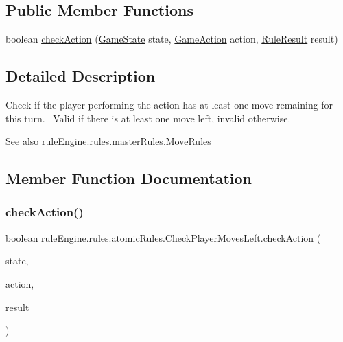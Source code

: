 \subsection*{Public Member Functions}
\begin{DoxyCompactItemize}
\item 
boolean \mbox{\hyperlink{classrule_engine_1_1rules_1_1atomic_rules_1_1_check_player_moves_left_a3a8f57bf10ee10f87444523e98dda4d0}{check\+Action}} (\mbox{\hyperlink{classgame_1_1game_state_1_1_game_state}{Game\+State}} state, \mbox{\hyperlink{classrule_engine_1_1_game_action}{Game\+Action}} action, \mbox{\hyperlink{classrule_engine_1_1_rule_result}{Rule\+Result}} result)
\end{DoxyCompactItemize}


\subsection{Detailed Description}
Check if the player performing the action has at least one move remaining for this turn.~\newline
 Valid if there is at least one move left, invalid otherwise.

\begin{DoxySeeAlso}{See also}
\mbox{\hyperlink{classrule_engine_1_1rules_1_1master_rules_1_1_move_rules}{rule\+Engine.\+rules.\+master\+Rules.\+Move\+Rules}} 
\end{DoxySeeAlso}


\subsection{Member Function Documentation}
\mbox{\label{classrule_engine_1_1rules_1_1atomic_rules_1_1_check_player_moves_left_a3a8f57bf10ee10f87444523e98dda4d0}} 
\subsubsection{\texorpdfstring{check\+Action()}{checkAction()}}
{\footnotesize\ttfamily boolean rule\+Engine.\+rules.\+atomic\+Rules.\+Check\+Player\+Moves\+Left.\+check\+Action (\begin{DoxyParamCaption}\item[{\mbox{\hyperlink{classgame_1_1game_state_1_1_game_state}{Game\+State}}}]{state,  }\item[{\mbox{\hyperlink{classrule_engine_1_1_game_action}{Game\+Action}}}]{action,  }\item[{\mbox{\hyperlink{classrule_engine_1_1_rule_result}{Rule\+Result}}}]{result }\end{DoxyParamCaption})\hspace{0.3cm}{\ttfamily [inline]}}



